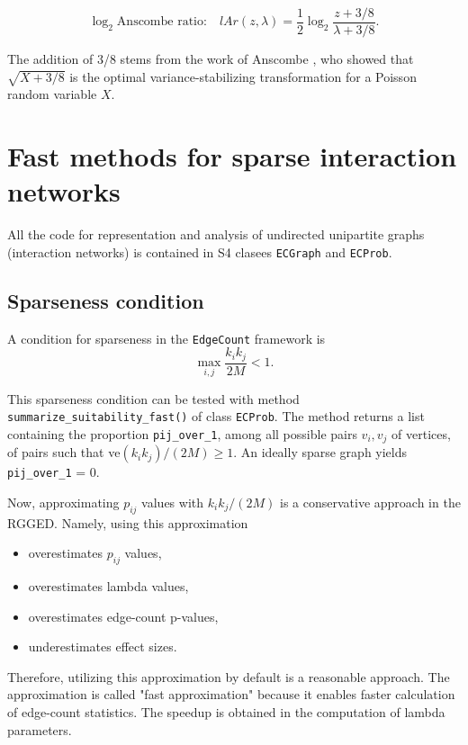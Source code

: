 \documentclass{article}\usepackage[]{graphicx}\usepackage[]{xcolor}
\begin{document}
\begin{equation}
\log_2 \text{Anscombe ratio:} \quad lAr \left(z, \lambda \right) = \frac{1}{2} \log_2 \frac{z + 3/8}{\lambda + 3/8}.
\end{equation}

The addition of 3/8 stems from the work of Anscombe \cite{anscombe1948}, who showed that $\sqrt{X + 3/8}$ is the optimal variance-stabilizing transformation for a Poisson random variable $X$.


\section{Fast methods for sparse interaction networks}

All the code for representation and analysis of undirected unipartite graphs (interaction networks) is contained in S4 clasees \texttt{ECGraph} and \texttt{ECProb}.

\subsection{Sparseness condition}

A condition for sparseness in the \texttt{EdgeCount} framework is
\begin{equation}
\max_{i,j} \frac{k_ik_j}{2M} < 1.
\end{equation}

This sparseness condition can be tested with method \texttt{summarize\_suitability\_fast()} of class \texttt{ECProb}.
The method returns a list containing the proportion \texttt{pij\_over\_1}, among all possible pairs $v_i,v_j$ of vertices, of pairs such that ve$(k_ik_j)/(2M) \geq 1$. An ideally sparse graph yields \texttt{pij\_over\_1} = 0.

Now, approximating $p_{ij}$ values with $k_ik_j/(2M)$ is a conservative approach in the RGGED. Namely, using this approximation
\begin{itemize}
\item[-] overestimates $p_{ij}$ values,
\item[-] overestimates lambda values,
\item[-] overestimates edge-count p-values,
\item[-] underestimates effect sizes.
\end{itemize}

Therefore, utilizing this approximation by default is a reasonable approach. The approximation is called "fast approximation" because it enables faster calculation of edge-count statistics. The speedup is obtained in the computation of lambda parameters.
\end{document}
